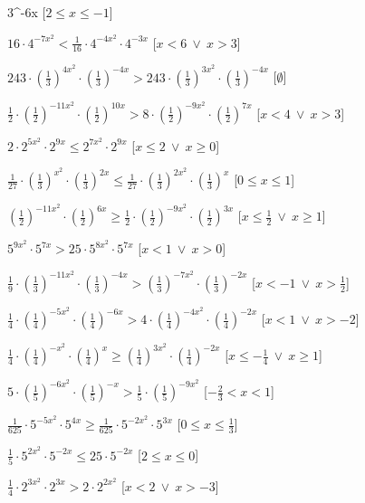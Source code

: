 \begin{esercizio}
\begin{enumeratea}
3^{{-6x}}\)
   \hfill [\(2 \leqslant x \leqslant -1\)]
  \item  \(16 \cdot 4^{{-7x^2}} < \frac{1}{16} \cdot 4^{{-4x^2}} \cdot 
4^{{-3x}}\)
   \hfill [\(x < 6~\vee~x > 3\)]
  \item  \(243 \cdot \left(\frac{1}{3}\right)^{{4x^2}} \cdot 
\left(\frac{1}{3}\right)^{{-4x}} > 243 \cdot \left(\frac{1}{3}\right)^{{3x^2}} 
\cdot \left(\frac{1}{3}\right)^{{-4x}}\)
   \hfill [\(\emptyset\)]
  \item  \(\frac{1}{2} \cdot \left(\frac{1}{2}\right)^{{-11x^2}} \cdot 
\left(\frac{1}{2}\right)^{{10x}} > 8 \cdot \left(\frac{1}{2}\right)^{{-9x^2}} 
\cdot \left(\frac{1}{2}\right)^{{7x}}\)
   \hfill [\(x < 4~\vee~x > 3\)]
  \item  \(2 \cdot 2^{{5x^2}} \cdot 2^{{9x}} \leqslant 2^{{7x^2}} \cdot 
2^{{9x}}\)
   \hfill [\(x \leqslant 2~\vee~x \geqslant 0\)]
  \item  \(\frac{1}{27} \cdot \left(\frac{1}{3}\right)^{{x^2}} \cdot 
\left(\frac{1}{3}\right)^{{2x}} \leqslant \frac{1}{27} \cdot 
\left(\frac{1}{3}\right)^{{2x^2}} \cdot \left(\frac{1}{3}\right)^{{x}}\)
   \hfill [\(0 \leqslant x \leqslant 1\)]
  \item  \(\left(\frac{1}{2}\right)^{{-11x^2}} \cdot 
\left(\frac{1}{2}\right)^{{6x}} \geqslant \frac{1}{2} \cdot 
\left(\frac{1}{2}\right)^{{-9x^2}} \cdot \left(\frac{1}{2}\right)^{{3x}}\)
   \hfill [\(x \leqslant \frac{1}{2}~\vee~x \geqslant 1\)]
  \item  \(5^{{9x^2}} \cdot 5^{{7x}} > 25 \cdot 5^{{8x^2}} \cdot 5^{{7x}}\)
   \hfill [\(x < 1~\vee~x > 0\)]
  \item  \(\frac{1}{9} \cdot \left(\frac{1}{3}\right)^{{-11x^2}} \cdot 
\left(\frac{1}{3}\right)^{{-4x}} > \left(\frac{1}{3}\right)^{{-7x^2}} \cdot 
\left(\frac{1}{3}\right)^{{-2x}}\)
   \hfill [\(x < -1~\vee~x > \frac{1}{2}\)]
  \item  \(\frac{1}{4} \cdot \left(\frac{1}{4}\right)^{{-5x^2}} \cdot 
\left(\frac{1}{4}\right)^{{-6x}} > 4 \cdot \left(\frac{1}{4}\right)^{{-4x^2}} 
\cdot \left(\frac{1}{4}\right)^{{-2x}}\)
   \hfill [\(x < 1~\vee~x > -2\)]
  \item  \(\frac{1}{4} \cdot \left(\frac{1}{4}\right)^{{-x^2}} \cdot 
\left(\frac{1}{4}\right)^{{x}} \geqslant \left(\frac{1}{4}\right)^{{3x^2}} \cdot 
\left(\frac{1}{4}\right)^{{-2x}}\)
   \hfill [\(x \leqslant -\frac{1}{4}~\vee~x \geqslant 1\)]
  \item  \(5 \cdot \left(\frac{1}{5}\right)^{{-6x^2}} \cdot 
\left(\frac{1}{5}\right)^{{-x}} > \frac{1}{5} \cdot 
\left(\frac{1}{5}\right)^{{-9x^2}}\)
   \hfill [\(-\frac{2}{3} < x < 1\)]
  \item  \(\frac{1}{625} \cdot 5^{{-5x^2}} \cdot 5^{{4x}} \geqslant 
\frac{1}{625} \cdot 5^{{-2x^2}} \cdot 5^{{3x}}\)
   \hfill [\(0 \leqslant x \leqslant \frac{1}{3}\)]
  \item  \(\frac{1}{5} \cdot 5^{{2x^2}} \cdot 5^{{-2x}} \leqslant 25 \cdot 
5^{{-2x}}\)
   \hfill [\(2 \leqslant x \leqslant 0\)]
  \item  \(\frac{1}{4} \cdot 2^{{3x^2}} \cdot 2^{{3x}} > 2 \cdot 2^{{2x^2}}\)
   \hfill [\(x < 2~\vee~x > -3\)]
 \end{enumeratea}
\end{esercizio}


